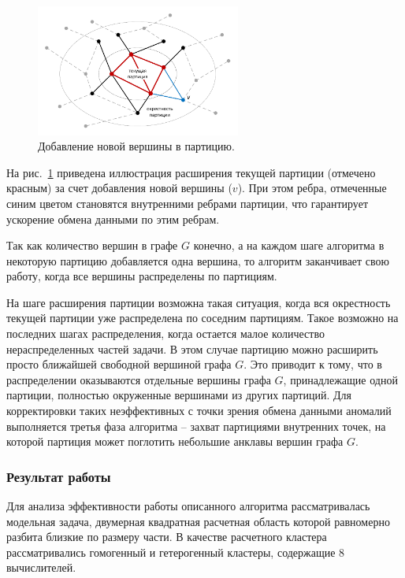 \begin{figure}[ht]
\centering
\includegraphics[width=0.6\textwidth]{./pics/text_2_getero/partition.pdf}
\singlespacing
{}\caption{Добавление новой вершины в партицию.}
\label{fig:text_2_getero_partition}
\end{figure}

На рис.~\ref{fig:text_2_getero_partition} приведена иллюстрация расширения текущей партиции (отмечено красным) за счет добавления новой вершины ($v$).
При этом ребра, отмеченные синим цветом становятся внутренними ребрами партиции, что гарантирует ускорение обмена данными по этим ребрам.

Так как количество вершин в графе $G$ конечно, а на каждом шаге алгоритма в некоторую партицию добавляется одна вершина, то алгоритм заканчивает свою работу, когда все вершины распределены по партициям.

На шаге расширения партиции возможна такая ситуация, когда вся окрестность текущей партиции уже распределена по соседним партициям.
Такое возможно на последних шагах распределения, когда остается малое количество нераспределенных частей задачи.
В этом случае партицию можно расширить просто ближайшей свободной вершиной графа $G$.
Это приводит к тому, что в распределении оказываются отдельные вершины графа $G$, принадлежащие одной партиции, полностью окруженные вершинами из других партиций.
Для корректировки таких неэффективных с точки зрения обмена данными аномалий выполняется третья фаза алгоритма -- захват партициями внутренних точек, на которой партиция может поглотить небольшие анклавы вершин графа $G$.

\subsubsection{Результат работы}

Для анализа эффективности работы описанного алгоритма рассматривалась модельная задача, двумерная квадратная расчетная область которой равномерно разбита близкие по размеру части.
В качестве расчетного кластера рассматривались гомогенный и гетерогенный кластеры, содержащие 8 вычислителей.

